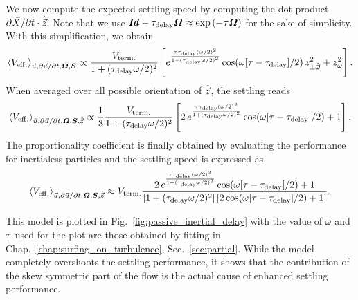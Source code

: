 We now compute the expected settling speed by computing the dot product $\partial \vec{X} / \partial t \cdot \hat{\vec{z}}$. 
Note that we use $\boldsymbol{\mathit{Id}} - \tau_{\mathrm{delay}} \boldsymbol{\varOmega} \approx \exp \left( -\tau \boldsymbol{\varOmega} \right)$ for the sake of simplicity.
With this simplification, we obtain
\begin{equation}
	\left\langle V_{\mathrm{eff.}} \right\rangle_{\vec{u}, \partial \vec{u} / \partial t, \boldsymbol{\varOmega}, \boldsymbol{S}} \propto \frac{V_{\mathrm{term.}}}{1 + (\tau_{\mathrm{delay}} \omega/2)^2} \left[e^{\frac{\tau \tau_{\mathrm{delay}} (\omega/2)^2}{1 + (\tau_{\mathrm{delay}} \omega/2)^2}} \cos(\omega [\tau - \tau_{\mathrm{delay}}] / 2) \, z_{\perp \hat{\vec{\omega}}}^2 + z_\omega^2 \right].
\end{equation}
When averaged over all possible orientation of $\hat{\vec{z}}$, the settling reads
\begin{equation}
	\left\langle V_{\mathrm{eff.}} \right\rangle_{\vec{u}, \partial \vec{u} / \partial t, \boldsymbol{\varOmega}, \boldsymbol{S}, \hat{\vec{z}}} \propto \frac{1}{3} \frac{V_{\mathrm{term.}}}{1 + (\tau_{\mathrm{delay}} \omega/2)^2} \left[ 2 \, e^{\frac{\tau \tau_{\mathrm{delay}} (\omega/2)^2}{1 + (\tau_{\mathrm{delay}} \omega/2)^2}} \cos(\omega [\tau - \tau_{\mathrm{delay}}] / 2) + 1 \right].
\end{equation}
The proportionality coefficient is finally obtained by evaluating the performance for inertialess particles and the settling speed is expressed as
\begin{equation}
	\left\langle V_{\mathrm{eff.}} \right\rangle_{\vec{u}, \partial \vec{u} / \partial t, \boldsymbol{\varOmega}, \boldsymbol{S}, \hat{\vec{z}}} \approx V_{\mathrm{term.}} \frac{2 \, e^{\frac{\tau \tau_{\mathrm{delay}} (\omega/2)^2}{1 + (\tau_{\mathrm{delay}} \omega/2)^2}} \cos(\omega [\tau - \tau_{\mathrm{delay}}] / 2) + 1}{\left[ 1 + (\tau_{\mathrm{delay}} \omega/2)^2 \right] \left[ 2 \cos(\omega [\tau - \tau_{\mathrm{delay}}] / 2) + 1 \right]}.
\end{equation}

This model is plotted in Fig.~\ref{fig:passive_inertial_delay} with the value of $\omega$ and $\tau$ used for the plot are those obtained by fitting in Chap.~\ref{chap:surfing_on_turbulence}, Sec.~\ref{sec:partial}.
While the model completely overshoots the settling performance, it shows that the contribution of the skew symmetric part of the flow is the actual cause of enhanced settling performance.

